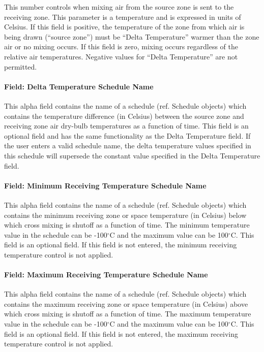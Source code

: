 This number controls when mixing air from the source zone is sent to the receiving zone. This parameter is a temperature and is expressed in units of Celsius. If this field is positive, the temperature of the zone from which air is being drawn (``source zone'') must be ``Delta Temperature'' warmer than the zone air or no mixing occurs. If this field is zero, mixing occurs regardless of the relative air temperatures. Negative values for ``Delta Temperature'' are not permitted.

\paragraph{Field: Delta Temperature Schedule Name}\label{field-delta-temperature-schedule-name-3}

This alpha field contains the name of a schedule (ref. Schedule objects) which contains the temperature difference (in Celsius) between the source zone and receiving zone air dry-bulb temperatures as a function of time. This field is an optional field and has the same functionality as the Delta Temperature field. If the user enters a valid schedule name, the delta temperature values specified in this schedule will supersede the constant value specified in the Delta Temperature field.

\paragraph{Field: Minimum Receiving Temperature Schedule Name}\label{field-minimum-zone-temperature-schedule-name-1}

This alpha field contains the name of a schedule (ref. Schedule objects) which contains the minimum receiving zone or space temperature (in Celsius) below which cross mixing is shutoff as a function of time. The minimum temperature value in the schedule can be -100$^\circ$C and the maximum value can be 100$^\circ$C. This field is an optional field. If this field is not entered, the minimum receiving temperature control is not applied.

\paragraph{Field: Maximum Receiving Temperature Schedule Name}\label{field-maximum-zone-temperature-schedule-name-1}

This alpha field contains the name of a schedule (ref. Schedule objects) which contains the maximum receiving zone or space temperature (in Celsius) above which cross mixing is shutoff as a function of time. The maximum temperature value in the schedule can be -100$^\circ$C and the maximum value can be 100$^\circ$C. This field is an optional field. If this field is not entered, the maximum receiving temperature control is not applied.

